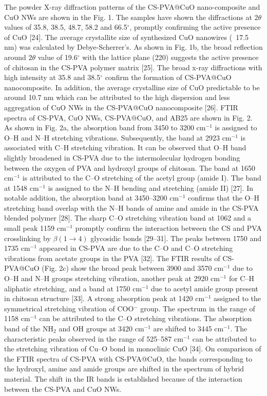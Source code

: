 \documentclass[final,5p,times,twocolumn,authoryear]{elsarticle}
\begin{document}
The powder X-ray diffraction patterns of the CS-PVA@CuO nano-composite and CuO NWs are shown in the Fig. 1. The samples have shown the diffractions at $2\theta$ values of 35.8, 38.5, 48.7, 58.2 and 66.5$^\circ$, promptly confirming the active presence of CuO [24]. The average crystallite size of synthesized CuO nanowires (~17.5 nm) was calculated by Debye-Scherrer's. As shown in Fig. 1b, the broad reflection around $2\theta$ value of 19.6$^\circ$ with the lattice plane (220) suggests the active presence of chitosan in the CS-PVA polymer matrix [25]. The broad x-ray diffractions with high intensity at 35.8 and 38.5$^\circ$ confirm the formation of CS-PVA@CuO nanocomposite. In addition, the average crystalline size of CuO predictable to be around 10.7 nm which can be attributed to the high dispersion and less aggregation of CuO NWs in the CS-PVA@CuO nanocomposite [26].
FTIR spectra of CS-PVA, CuO NWs, CS-PVA@CuO, and AB25 are shown in Fig. 2. As shown in Fig. 2a, the absorption band from 3450 to 3200 cm$^{-1}$ is assigned to O--H and N--H stretching vibrations. Subsequently, the band at 2923 cm$^{-1}$ is associated with C--H stretching vibration. It can be observed that O--H band slightly broadened in CS-PVA due to the intermolecular hydrogen bonding between the oxygen of PVA and hydroxyl groups of chitosan. The band at 1650 cm$^{-1}$ is attributed to the C--O stretching of the acetyl group (amide I). The band at 1548 cm$^{-1}$ is assigned to the N--H bending and stretching (amide II) [27]. In notable addition, the absorption band at 3450--3200 cm$^{-1}$ confirms that the O--H stretching band overlap with the N--H bands of amine and amide in the CS-PVA blended polymer [28]. The sharp C--O stretching vibration band at 1062 and a small peak 1159 cm$^{-1}$ promptly confirm the interaction between the CS and PVA crosslinking by $\beta(1 \rightarrow 4)$ glycosidic bonds [29--31]. The peaks between 1750 and 1735 cm$^{-1}$ appeared in CS-PVA are due to the C--O and C--O stretching vibrations from acetate groups in the PVA [32].
The FTIR results of CS-PVA@CuO (Fig. 2c) show the broad peak between 3900 and 3570 cm$^{-1}$ due to O--H and N--H groups stretching vibration, another peak at 2920 cm$^{-1}$ for C--H aliphatic stretching, and a band at 1750 cm$^{-1}$ due to acetyl amide group present in chitosan structure [33]. A strong absorption peak at 1420 cm$^{-1}$ assigned to the symmetrical stretching vibration of COO$^{-}$ group. The spectrum in the range of 1158 cm$^{-1}$ can be attributed to the C--O stretching vibrations. The absorption band of the NH$_2$ and OH groups at 3420 cm$^{-1}$ are shifted to 3445 cm$^{-1}$. The characteristic peaks observed in the range of 525--587 cm$^{-1}$ can be attributed to the stretching vibration of Cu--O bond in monoclinic CuO [34]. On comparison of the FTIR spectra of CS-PVA with CS-PVA@CuO, the bands corresponding to the hydroxyl, amine and amide groups are shifted in the spectrum of hybrid material. The shift in the IR bands is established because of the interaction between the CS-PVA and CuO NWs.
\end{document}
